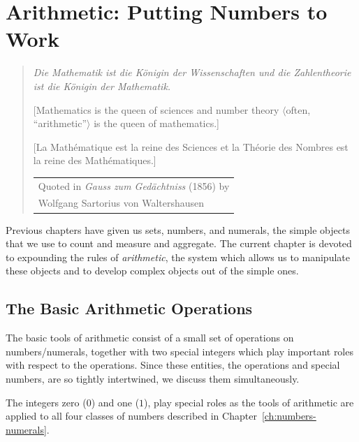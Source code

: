 
\chapter{Arithmetic: Putting Numbers to Work}
\label{ch:arithmetic}


\hfill
\begin{quote}
{\it Die Mathematik ist die K\"{o}nigin der Wissenschaften und die
Zahlentheorie ist die K\"{o}nigin der Mathematik.}

[Mathematics is the queen of sciences and number theory
  $\langle$often, ``arithmetic''$\rangle$ is the queen of
  mathematics.]
  
  [La Math\'ematique est la reine des Sciences et la Th\'eorie des Nombres est la reine des Math\'ematiques.]

\hfill
\begin{tabular}{l}
Quoted in {\it Gauss zum Gedächtniss} (1856) by \\
Wolfgang Sartorius von Waltershausen 
\end{tabular}
\end{quote}

\bigskip

Previous chapters have given us sets, numbers, and numerals, the
simple objects that we use to count and measure and aggregate.  The
current chapter is devoted to expounding the rules of {\em
  arithmetic}, the system which allows us to manipulate these objects
and to develop complex objects out of the simple ones.

\section{The Basic Arithmetic Operations}
\label{sec:Arithmetic-Tools}

The basic tools of arithmetic consist of a small set of operations on
numbers/numerals, together with two special integers which play
important roles with respect to the operations.  Since these entities,
the operations and special numbers, are so tightly intertwined, we
discuss them simultaneously.

\smallskip

The integers zero ($0$)
and one ($1$),
play special roles as the tools of arithmetic are applied to all four
classes of numbers described in Chapter~\ref{ch:numbers-numerals}.

